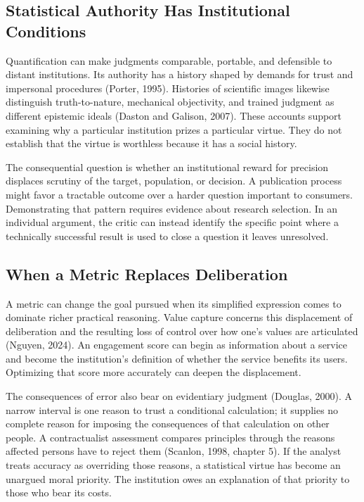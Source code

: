 \hypertarget{M09-statistical-authority-has-institutional-conditions}{%
\subsection{Statistical Authority Has Institutional
Conditions}\label{M09-statistical-authority-has-institutional-conditions}}

\noindent \noindent Quantification can make judgments comparable, portable, and
defensible to distant institutions. Its authority has a history shaped
by demands for trust and impersonal procedures (Porter, 1995). Histories
of scientific images likewise distinguish truth-to-nature, mechanical
objectivity, and trained judgment as different epistemic ideals (Daston
and Galison, 2007). These accounts support examining why a particular
institution prizes a particular virtue. They do not establish that the
virtue is worthless because it has a social history.

The consequential question is whether an institutional reward for
precision displaces scrutiny of the target, population, or decision. A
publication process might favor a tractable outcome over a harder
question important to consumers. Demonstrating that pattern requires
evidence about research selection. In an individual argument, the critic
can instead identify the specific point where a technically successful
result is used to close a question it leaves unresolved.

\hypertarget{M09-when-a-metric-replaces-deliberation}{%
\subsection{When a Metric Replaces
Deliberation}\label{M09-when-a-metric-replaces-deliberation}}

\noindent \noindent A metric can change the goal pursued when its simplified
expression comes to dominate richer practical reasoning. Value capture
concerns this displacement of deliberation and the resulting loss of
control over how one's values are articulated (Nguyen, 2024). An
engagement score can begin as information about a service and become the
institution's definition of whether the service benefits its users.
Optimizing that score more accurately can deepen the displacement.

The consequences of error also bear on evidentiary judgment (Douglas,
2000). A narrow interval is one reason to trust a conditional
calculation; it supplies no complete reason for imposing the
consequences of that calculation on other people. A contractualist
assessment compares principles through the reasons affected persons have
to reject them (Scanlon, 1998, chapter 5). If the analyst treats
accuracy as overriding those reasons, a statistical virtue has become an
unargued moral priority. The institution owes an explanation of that
priority to those who bear its costs.

